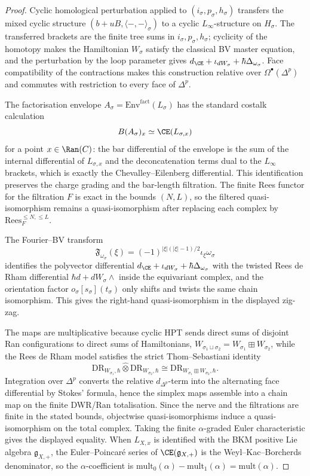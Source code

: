 \begin{proof}
Cyclic homological perturbation applied to
$(i_\sigma,p_\sigma,h_\sigma)$ transfers the mixed cyclic structure
$(b+uB,\langle-,-\rangle_\sigma)$ to a cyclic $L_\infty$-structure on
$H_\sigma$.  The transferred brackets are the finite tree sums in
$i_\sigma,p_\sigma,h_\sigma$; cyclicity of the homotopy makes the
Hamiltonian $W_\sigma$ satisfy the classical BV master equation, and
the perturbation by the loop parameter gives
$d_{\CE}+\iota_{dW_\sigma}+\hbar\Delta_{\omega_\sigma}$.  Face
compatibility of the contractions makes this construction relative over
$\Omega^\bullet(\Delta^p)$ and commutes with restriction to every face
of $\Delta^p$.

The factorisation envelope $A_\sigma=\mathrm{Env}^{\mathrm{fact}}(L_\sigma)$
has the standard costalk calculation
\[
 B(A_\sigma)_x\simeq \CE(L_{\sigma,x})
\]
for a point $x\in\Ran(C)$: the bar differential of the envelope is the
sum of the internal differential of $L_{\sigma,x}$ and the
deconcatenation terms dual to the $L_\infty$ brackets, which is exactly
the Chevalley--Eilenberg differential.  This identification preserves
the charge grading and the bar-length filtration.  The finite Rees
functor for the filtration $F$ is exact in the bounds
$(N,L)$, so the filtered quasi-isomorphism remains a quasi-isomorphism
after replacing each complex by
$\mathrm{Rees}_{F}^{\le N,\le L}$.

The Fourier--BV transform
\[
 \mathfrak F_{\omega_\sigma}(\xi)
 =
 (-1)^{|\xi|(|\xi|-1)/2}\iota_\xi\omega_\sigma
\]
identifies the polyvector differential
$d_{\CE}+\iota_{dW_\sigma}+\hbar\Delta_{\omega_\sigma}$ with the
twisted Rees de Rham differential $\hbar d+dW_\sigma\wedge$ inside the
equivariant complex, and the orientation factor
$o_\sigma[s_\sigma](t_\sigma)$ only shifts and twists the same chain
isomorphism.  This gives the right-hand quasi-isomorphism in the
displayed zig-zag.

The maps are multiplicative because cyclic HPT sends direct sums of
disjoint Ran configurations to direct sums of Hamiltonians,
$W_{\sigma_1\sqcup\sigma_2}=W_{\sigma_1}\boxplus W_{\sigma_2}$, while
the Rees de Rham model satisfies the strict Thom--Sebastiani identity
\[
 \mathrm{DR}_{W_{\sigma_1},\hbar}\widehat\otimes
 \mathrm{DR}_{W_{\sigma_2},\hbar}
 \cong
 \mathrm{DR}_{W_{\sigma_1}\boxplus W_{\sigma_2},\hbar}.
\]
Integration over $\Delta^p$ converts the relative
$d_{\Delta^p}$-term into the alternating face differential by Stokes'
formula, hence the simplex maps assemble into a chain map on the
finite DWR/Ran totalisation.  Since the nerve and the filtrations are
finite in the stated bounds, objectwise quasi-isomorphisms induce a
quasi-isomorphism on the total complex.  Taking the finite
$\alpha$-graded Euler characteristic gives the displayed equality.
When $L_{X,x}$ is identified with the BKM positive Lie algebra
$\mathfrak g_{X,+}$, the Euler--Poincar\'e series of
$\CE(\mathfrak g_{X,+})$ is the Weyl--Kac--Borcherds denominator, so
the $\alpha$-coefficient is
$\mathrm{mult}_0(\alpha)-\mathrm{mult}_1(\alpha)=\mathrm{mult}(\alpha)$.
\end{proof}

